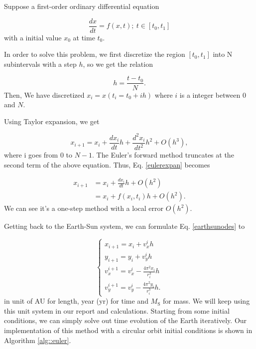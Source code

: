 Suppose a first-order ordinary differential equation

\begin{equation}
	\frac{dx}{dt} = f(x,t);\ t\in[t_0,t_1]
\end{equation}
with a initial value $x_0$ at time $t_0$. 

In order to solve this problem, we first discretize the region $ [t_0,t_1]$ into N subintervals with a step $h$, so we get the relation

\begin{equation}
	h=\frac{t-t_0}{N}.
\end{equation}
Then, We have discretized $x_i=x(t_i=t_0+ih)$ where $i$ is a integer between 0 and $N$.

Using Taylor expansion, we get 

\begin{equation}
	\label{eulerexpan}
	x_{i+1} = x_i + \frac{dx_i}{dt}h + \frac{d^2x_i}{dt^2}h^2 + O(h^3),
\end{equation}
where i goes from 0 to $N-1$.
The Euler's forward method truncates at the second term of the above equation.
Thus, Eq. \ref{eulerexpan} becomes

\begin{equation}
	\begin{aligned}
		x_{i+1} & = x_i + \frac{dx_i}{dt}h + O(h^2) \\ 
				& = x_i + f(x_i,t_i)h + O(h^2).
	\end{aligned}
\end{equation}
We can see it's a one-step method with a local error $O(h^2)$.

Getting back to the Earth-Sun system, we can formulate Eq. \ref{earthsunodes} to

\begin{equation}
	\left\{  
             \begin{array}{lr}  
             	x_{i+1} = x_i + v_x^{i}h \\
				y_{i+1} = y_i + v_y^{i}h \\
             	v_x^{i+1} = v_x^{i} - \frac{4\pi^2x_i}{r_i^3}h\\
             	v_y^{i+1} = v_y^{i} - \frac{4\pi^2y_i}{r_i^3}h.
			\end{array}  
	\right.	
\end{equation} 
in unit of AU for length, year (yr) for time and $M_{\mathrm{S}}$ for mass. 
We will keep using this unit system in our report and calculations. 
Starting from some initial conditions, we can simply solve out time evolution of the Earth iteratively. 
Our implementation of this method with a  circular orbit initial conditions is shown in Algorithm \ref{alg::euler}. 


